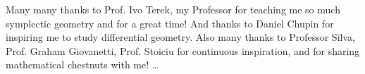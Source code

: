 
Many many thanks to Prof. Ivo Terek, my Professor for teaching me so much symplectic geometry and for a great time! And thanks to Daniel Chupin for inspiring me to study differential geometry. Also many thanks to Professor Silva, Prof. Graham Giovanetti, Prof. Stoiciu for continuous inspiration, and for sharing mathematical chestnuts with me!  \ldots


